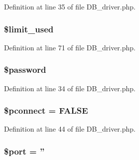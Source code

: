 Definition at line 35 of file D\-B\-\_\-driver.\-php.

\hypertarget{class_c_i___d_b__driver_a96df35d7e3e76bef21ebb80234fe59e8}{
\subsubsection[{\$limit\-\_\-used}]{\setlength{\rightskip}{0pt plus 5cm}\$limit\-\_\-used}}\label{class_c_i___d_b__driver_a96df35d7e3e76bef21ebb80234fe59e8}


Definition at line 71 of file D\-B\-\_\-driver.\-php.

\hypertarget{class_c_i___d_b__driver_a607686ef9f99ea7c42f4f3dd3dbb2b0d}{
\subsubsection[{\$password}]{\setlength{\rightskip}{0pt plus 5cm}\$password}}\label{class_c_i___d_b__driver_a607686ef9f99ea7c42f4f3dd3dbb2b0d}


Definition at line 34 of file D\-B\-\_\-driver.\-php.

\hypertarget{class_c_i___d_b__driver_a5b7c010f6dfe8dfd41ce86fdaed67ebf}{
\subsubsection[{\$pconnect}]{\setlength{\rightskip}{0pt plus 5cm}\$pconnect = F\-A\-L\-S\-E}}\label{class_c_i___d_b__driver_a5b7c010f6dfe8dfd41ce86fdaed67ebf}


Definition at line 44 of file D\-B\-\_\-driver.\-php.

\hypertarget{class_c_i___d_b__driver_aa0787efab4b22e8a212882f3409d4c77}{
\subsubsection[{\$port}]{\setlength{\rightskip}{0pt plus 5cm}\$port = ''}}\label{class_c_i___d_b__driver_aa0787efab4b22e8a212882f3409d4c77}



